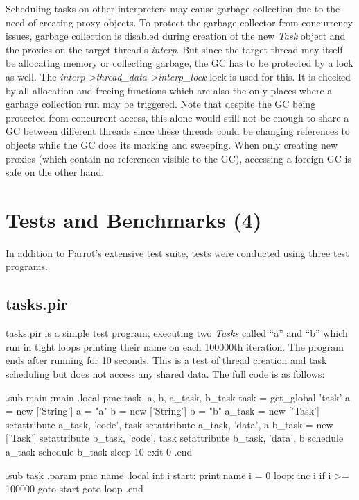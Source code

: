 \documentclass[bachelor,english]{hgbthesis}
\begin{document}
Scheduling tasks on other interpreters may cause garbage collection due to the need of creating proxy objects. To protect the garbage collector from concurrency issues, garbage collection is disabled during creation of the new \textit{Task} object and the proxies on the target thread's \textit{interp}. But since the target thread may itself be allocating memory or collecting garbage, the GC has to be protected by a lock as well. The \textit{interp->thread\_data->interp\_lock} lock is used for this. It is checked by all allocation and freeing functions which are also the only places where a garbage collection run may be triggered. Note that despite the GC being protected from concurrent access, this alone would still not be enough to share a GC between different threads since these threads could be changing references to objects while the GC does its marking and sweeping. When only creating new proxies (which contain no references visible to the GC), accessing a foreign GC is safe on the other hand.

\chapter{Tests and Benchmarks (4)}

In addition to Parrot's extensive test suite, tests were conducted using three test programs.

\section{tasks.pir}

tasks.pir is a simple test program, executing two \textit{Tasks} called ``a'' and ``b'' which run in tight loops printing their name on each 100000th iteration. The program ends after running for 10 seconds. This is a test of thread creation and task scheduling but does not access any shared data. The full code is as follows:
%
\begin{GenericCode}
.sub main :main
    .local pmc task, a, b, a_task, b_task
    task = get_global 'task'
    a = new ['String']
    a = "a"
    b = new ['String']
    b = "b"
    a_task = new ['Task']
    setattribute a_task, 'code', task
    setattribute a_task, 'data', a
    b_task = new ['Task']
    setattribute b_task, 'code', task
    setattribute b_task, 'data', b
    schedule a_task
    schedule b_task
    sleep 10
    exit 0
.end

.sub task
    .param pmc name
    .local int i
start:
    print name
    i = 0
loop:
    inc i
    if i >= 100000 goto start
    goto loop
.end
\end{GenericCode}
\end{document}
